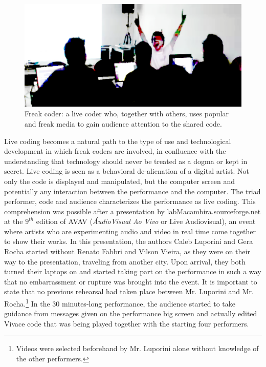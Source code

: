 \documentclass[letterpaper, 12pt]{article}
\begin{document}
\begin{figure}[htpb]
  \begin{center}
    \includegraphics[scale=.4]{img/fig_freakcoder.png}
    \caption{Freak coder: a live coder who, together with others, uses
      popular and freak media to gain audience attention to the shared
      code.}
    \label{fig:freakcoder}
  \end{center}
\end{figure}

Live coding becomes a natural path to the type of use and
technological development in which freak coders are involved, in
confluence with the understanding that technology should never be
treated as a dogma or kept in secret. Live coding is seen as a
behavioral de-alienation of a digital artist. Not only the code is
displayed and manipulated, but the computer screen and potentially any
interaction between the performance and the computer. The triad
performer, code and audience characterizes the performance as live
coding.  This comprehension was possible after a presentation by
labMacambira.sourceforge.net at the $9^{th}$ edition of AVAV
(\textit{\'{A}udioVisual Ao Vivo} or Live Audiovisual), an event where
artists who are experimenting audio and video in real time come
together to show their works. In this presentation, the authors Caleb
Luporini and Gera Rocha started without Renato Fabbri and Vilson
Vieira, as they were on their way to the presentation, traveling from
another city. Upon arrival, they both turned their laptops on and
started taking part on the performance in such a way that no
embarrassment or rupture was brought into the event.  It is important
to state that no previous rehearsal had taken place between
Mr. Luporini and Mr. Rocha.\footnote{Videos were selected beforehand
  by Mr. Luporini alone without knowledge of the other performers.} In
the 30 minutes-long performance, the audience started to take guidance
from messages given on the performance big screen and actually edited
Vivace code that was being played together with the starting four
performers.
\end{document}
